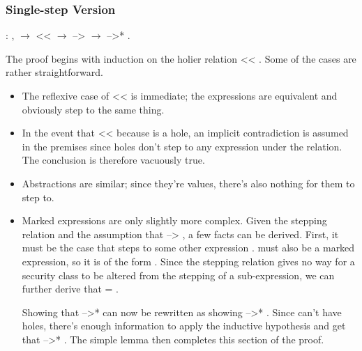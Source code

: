 \documentclass[12pt]{report}
\begin{document}
\subsubsection{Single-step Version}

\begin{coqdoccode}
\coqdocemptyline
\coqdocindent{1.00em}
  : \coqdockw{\ensuremath{\forall}}   ,\coqdoceol
\coqdocindent{2.00em}
  \ensuremath{\rightarrow}\coqdoceol
\coqdocindent{2.00em}
 <<  \ensuremath{\rightarrow}\coqdoceol
\coqdocindent{2.00em}
 -->  \ensuremath{\rightarrow}\coqdoceol
\coqdocindent{2.00em}
 -->* .\coqdoceol
\coqdocemptyline
\end{coqdoccode}
The proof begins with induction on the holier relation  <<
. Some of the cases are rather straightforward. 




\begin{itemize}
\item  The reflexive case of  <<  is immediate; the expressions are
  equivalent and obviously step to the same thing.



\item  In the event that  <<  because  is a hole, an implicit
  contradiction is assumed in the premises since holes don't step to
  any expression under the  relation. The conclusion is
  therefore vacuously true.



\item  Abstractions are similar; since they're values, there's also
  nothing for them to step to.



\item  Marked expressions are only slightly more complex. Given the
  stepping relation and the assumption that    -->
  , a few facts can be derived. First, it must be the case that
   steps to some other expression .  must also be
  a marked expression, so it is of the form  
  . Since the stepping relation gives no way for a security
  class to be altered from the stepping of a sub-expression, we can
  further derive that  = .


  Showing that  -->*  can now be rewritten as showing 
    -->*   . Since  can't have
  holes, there's enough information to apply the inductive hypothesis
  and get that  -->* . The simple lemma
   then completes this section of the
  proof. 
\end{itemize}
\end{document}
